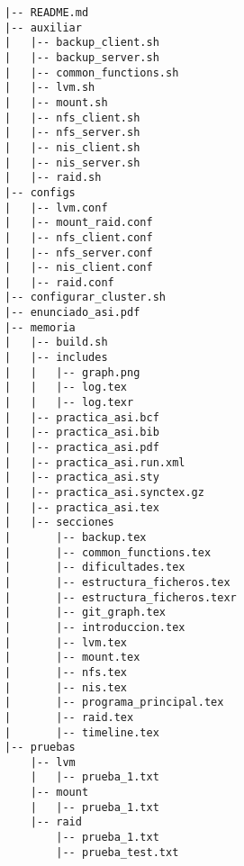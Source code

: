 \begin{verbatim}
|-- README.md
|-- auxiliar
|   |-- backup_client.sh
|   |-- backup_server.sh
|   |-- common_functions.sh
|   |-- lvm.sh
|   |-- mount.sh
|   |-- nfs_client.sh
|   |-- nfs_server.sh
|   |-- nis_client.sh
|   |-- nis_server.sh
|   |-- raid.sh
|-- configs
|   |-- lvm.conf
|   |-- mount_raid.conf
|   |-- nfs_client.conf
|   |-- nfs_server.conf
|   |-- nis_client.conf
|   |-- raid.conf
|-- configurar_cluster.sh
|-- enunciado_asi.pdf
|-- memoria
|   |-- build.sh
|   |-- includes
|   |   |-- graph.png
|   |   |-- log.tex
|   |   |-- log.texr
|   |-- practica_asi.bcf
|   |-- practica_asi.bib
|   |-- practica_asi.pdf
|   |-- practica_asi.run.xml
|   |-- practica_asi.sty
|   |-- practica_asi.synctex.gz
|   |-- practica_asi.tex
|   |-- secciones
|       |-- backup.tex
|       |-- common_functions.tex
|       |-- dificultades.tex
|       |-- estructura_ficheros.tex
|       |-- estructura_ficheros.texr
|       |-- git_graph.tex
|       |-- introduccion.tex
|       |-- lvm.tex
|       |-- mount.tex
|       |-- nfs.tex
|       |-- nis.tex
|       |-- programa_principal.tex
|       |-- raid.tex
|       |-- timeline.tex
|-- pruebas
    |-- lvm
    |   |-- prueba_1.txt
    |-- mount
    |   |-- prueba_1.txt
    |-- raid
        |-- prueba_1.txt
        |-- prueba_test.txt
\end{verbatim}
